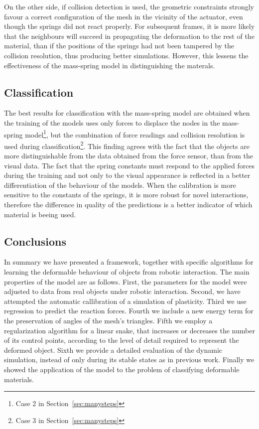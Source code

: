 \documentclass[journal]{IEEEtran}
\newcommand{\sref}[1]{Section~\ref{#1}}
\newcounter{algorithm}
\begin{document}
On the other side, if collision detection is used, the geometric constraints strongly favour a correct configuration of the mesh in the vicinity of the actuator, even though the springs did not react properly.  For subsequent frames, it is more likely that the neighbours will succeed in propagating the deformation to the rest of the material, than if the positions of the springs had not been tampered by the collision resolution, thus producing better simulations.  However, this lessens the effectiveness of the mass-spring model in distinguishing the materals.

\subsection{Classification}
The best results for classification with the mass-spring model are obtained when the training of the models uses only forces to displace the nodes in the mass-spring model\footnote{Case 2 in \sref{sec:manysteps}}, but the combination of force readings and collision resolution is used during classification\footnote{Case 3 in \sref{sec:manysteps}}.  This finding agrees with the fact that the objects are more distinguishable from the data obtained from the force sensor, than from the visual data.  The fact that the spring constants must respond to the applied forces during the training and not only to the visual appearance is reflected in a better differentiation of the behaviour of the models.  When the calibration is more sensitive to the constants of the springs, it is more robust for novel interactions, therefore the difference in quality of the predictions is a better indicator of which material is beeing used.

\subsection{Conclusions}
In summary we have presented a framework, together with specific algorithms for learning the deformable behaviour of objects from robotic interaction. The main properties of the model are as follows. First, the parameters for the model were adjusted to data from real objects under robotic interaction. Second, we have attempted the automatic callibration of a simulation of plasticity. Third we use regression to predict the reaction forces. Fourth we include a new energy term for the preservation of angles of the mesh's triangles. Fifth we employ a regularization algorithm for a linear snake, that increases or decreases the number of its control points, according to the level of detail required to represent the deformed object. Sixth we provide a detailed evaluation of the dynamic simulation, instead of only during its stable states as in previous work. Finally we showed the application of the model to the problem of classifying deformable materials.
\end{document}
